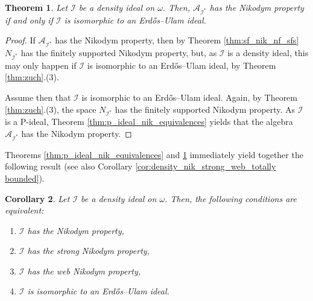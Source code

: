 \documentclass[a4paper,11pt,fleqn]{amsart}
\newtheorem{theorem}{Theorem}[section]
\newtheorem{corollary}[theorem]{Corollary}
\theoremstyle{definition}
\theoremstyle{remark}
\numberwithin{equation}{section}
\newcommand{\N}{\mathbb{N}}
\newcommand{\aA}{\mathcal{A}}
\newcommand{\iI}{\mathcal{I}}
\newcommand{\rstr}{\restriction}
\newcommand{\seqn}[1]{\big\langle#1\colon\ n\io\big\rangle}
\newcommand{\clopen}[1]{\left[#1\right]}
\newcommand{\io}{\in\omega}%
\newcommand{\erdos}{{Erd\H{o}s}}
\begin{document}
\begin{theorem}\label{thm:dens_nik_erdos_ulam}
Let $\iI$ be a density ideal on $\omega$. Then, $\aA_{\iI^*}$ has the Nikodym property if and only if $\iI$ is isomorphic to an \erdos--Ulam ideal.
\end{theorem}
\begin{proof}
If $\aA_{\iI^*}$ has the Nikodym property, then by Theorem \ref{thm:sf_nik_nf_sfs} $N_{\iI^*}$ has the finitely supported Nikodym property, but, as $\iI$ is a density ideal, this may only happen if $\iI$ is isomorphic to an \erdos--Ulam ideal, by Theorem \ref{thm:zuch}.(3). 

Assume then that $\iI$ is isomorphic to an \erdos--Ulam ideal. %
%    
Again, by Theorem \ref{thm:zuch}.(3), the space $N_{\iI^*}$ has the finitely supported Nikodym property. As $\iI$ is a P-ideal, Theorem \ref{thm:p_ideal_nik_equivalences} yields that the algebra $\aA_{\iI^*}$ has the Nikodym property.
\end{proof}

Theorems \ref{thm:p_ideal_nik_equivalences} and \ref{thm:dens_nik_erdos_ulam} immediately yield together the following result (see also Corollary \ref{cor:density_nik_strong_web_totally bounded}).

\begin{corollary}\label{cor:density_nik_strong_web}
    Let $\iI$ be a density ideal on $\omega$. Then, the following conditions are equivalent:
    \begin{enumerate}
        \item $\iI$ has the Nikodym property,
        \item $\iI$ has the strong Nikodym property,
        \item $\iI$ has the web Nikodym property,
        \item $\iI$ is isomorphic to an \erdos--Ulam ideal.
    \end{enumerate}
\end{corollary}
\end{document}
